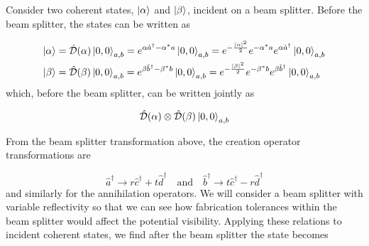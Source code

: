 
Consider two coherent states, $\ket{\alpha}$ and $\ket{\beta}$, incident on a beam splitter. Before the beam splitter, the states can be written as

\begin{align}
	\ket{\alpha} &= \hat{\mathcal{D}}(\alpha)\ket{0,0}_{a,b} = e^{\alpha \hat{a}^\dagger - \alpha^\ast a}\ket{0,0}_{a,b} = e^{-\frac{|\alpha|^2}{2}} e^{-\alpha^\ast a} e^{\alpha \hat{a}^\dagger}\ket{0,0}_{a,b}\\
	\ket{\beta} &= \hat{\mathcal{D}}(\beta)\ket{0,0}_{a,b} = e^{\beta \hat{b}^\dagger - \beta^\ast b}\ket{0,0}_{a,b} = e^{-\frac{|\beta|^2}{2}} e^{-\beta^\ast b} e^{\beta \hat{b}^\dagger}\ket{0,0}_{a,b}
\end{align}
which, before the beam splitter, can be written jointly as

\begin{equation}
	\hat{\mathcal{D}}(\alpha)\otimes\hat{\mathcal{D}}(\beta)\ket{0,0}_{a,b}
\end{equation}

%

From the beam splitter transformation above, the creation operator transformations are

\begin{equation}
	\hat{a}^\dagger \rightarrow r\hat{c}^\dagger + t\hat{d}^\dagger \quad \text{and} \quad \hat{b}^\dagger \rightarrow t\hat{c}^\dagger - r\hat{d}^\dagger
\end{equation}
and similarly for the annihilation operators. We will consider a beam splitter with variable reflectivity so that we can see how fabrication tolerances within the beam splitter would affect the potential visibility. Applying these relations to incident coherent states, we find after the beam splitter the state becomes

